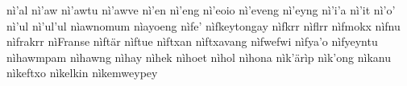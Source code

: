\documentclass[a4paper]{article}
\begin{document}
nì'al\hspace{2mm}
nì'aw\hspace{2mm}
nì'awtu\hspace{2mm}
nì'awve\hspace{2mm}
nì'en\hspace{2mm}
nì'eng\hspace{2mm}
nì'eoio\hspace{2mm}
nì'eveng\hspace{2mm}
nì'eyng\hspace{2mm}
nì'i'a\hspace{2mm}
nì'it\hspace{2mm}
nì'o'\hspace{2mm}
nì'ul\hspace{2mm}
nì'ul'ul\hspace{2mm}
nìawnomum\hspace{2mm}
nìayoeng\hspace{2mm}
nìfe'\hspace{2mm}
nìfkeytongay\hspace{2mm}
nìfkrr\hspace{2mm}
nìflrr\hspace{2mm}
nìfmokx\hspace{2mm}
nìfnu\hspace{2mm}
nìfrakrr\hspace{2mm}
nìFranse\hspace{2mm}
nìftär\hspace{2mm}
nìftue\hspace{2mm}
nìftxan\hspace{2mm}
nìftxavang\hspace{2mm}
nìfwefwi\hspace{2mm}
nìfya'o\hspace{2mm}
nìfyeyntu\hspace{2mm}
nìhawmpam\hspace{2mm}
nìhawng\hspace{2mm}
nìhay\hspace{2mm}
nìhek\hspace{2mm}
nìhoet\hspace{2mm}
nìhol\hspace{2mm}
nìhona\hspace{2mm}
nìk'ärìp\hspace{2mm}
nìk'ong\hspace{2mm}
nìkanu\hspace{2mm}
nìkeftxo\hspace{2mm}
nìkelkin\hspace{2mm}
nìkemweypey\hspace{2mm}
\end{document}
